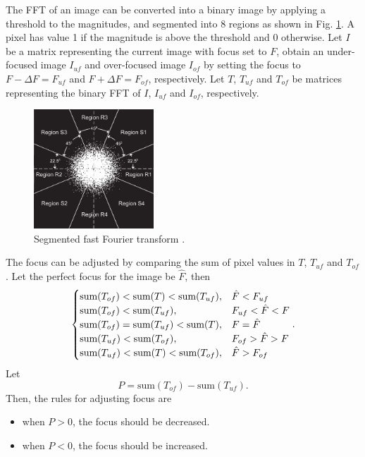 \documentclass[12pt, conference]{IEEEtran}
\begin{document}
The FFT of an image can be converted into a binary image by applying a threshold to the magnitudes, and segmented into 8 regions as shown in Fig. \ref{FFT regions}. A pixel has value 1 if the magnitude is above the threshold and 0 otherwise. Let $I$ be a matrix representing the current image with focus set to $F$, obtain an under-focused image $I_{uf}$ and over-focused image $I_{of}$ by setting the focus to $F-\Delta F=F_{uf}$ and $F+\Delta F=F_{of}$, respectively. Let $T$, $T_{uf}$ and $T_{of}$ be matrices representing the binary FFT of $I$, $I_{uf}$ and $I_{of}$, respectively.

\begin{figure}[htbp]
    \centering
    \includegraphics[width=0.4\textwidth]{Images/FFT regions.jpg}
    \caption{Segmented fast Fourier transform \cite{SEM correction algorithm}.}
    \label{FFT regions}
\end{figure}

The focus can be adjusted by comparing the sum of pixel values in $T$, $T_{uf}$ and $T_{of}$. Let the perfect focus for the image be $\hat{F}$, then
\begin{align*}
    \small
\begin{cases}
    \text{sum}(T_{of}) < \text{sum}(T) < \text{sum}(T_{uf}), & \hat{F} < F_{uf} \\
    \text{sum}(T_{of}) < \text{sum}(T_{uf}), & F_{uf} < \hat{F} < F \\
    \text{sum}(T_{of}) = \text{sum}(T_{uf}) < \text{sum}(T), & F = \hat{F} \\
    \text{sum}(T_{uf}) < \text{sum}(T_{of}), & F_{of} > \hat{F} > F \\
    \text{sum}(T_{uf}) < \text{sum}(T) < \text{sum}(T_{of}), & \hat{F} > F_{of}
\end{cases}.
\end{align*}
Let
\begin{equation}
    P = \text{sum}(T_{of}) - \text{sum}(T_{uf}).
\end{equation}
Then, the rules for adjusting focus are
\begin{itemize}
    \item when $P>0$, the focus should be decreased.
    \item when $P<0$, the focus should be increased.
\end{itemize}
\end{document}
